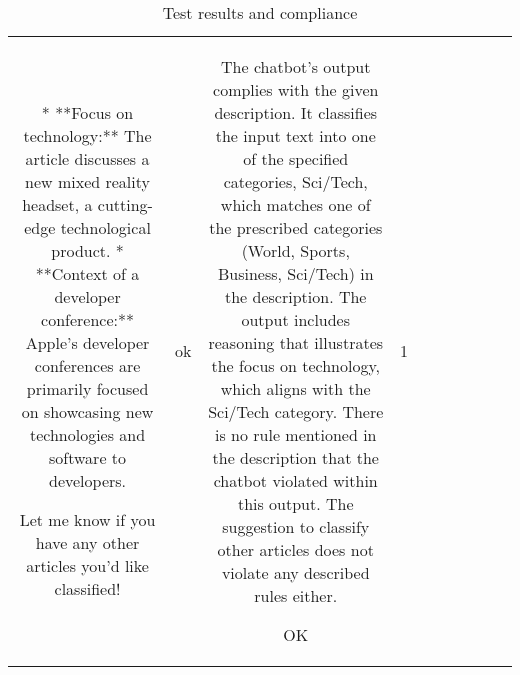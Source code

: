 \begin{table}[h!]
\begin{tabular}{|c|c|c|c|c|c|c|c|c|c|}
* **Focus on technology:** The article discusses a new mixed reality headset, a cutting-edge technological product.
* **Context of a developer conference:** Apple's developer conferences are primarily focused on showcasing new technologies and software to developers.



Let me know if you have any other articles you'd like classified! 
 & ok & The chatbot's output complies with the given description. It classifies the input text into one of the specified categories, Sci/Tech, which matches one of the prescribed categories (World, Sports, Business, Sci/Tech) in the description. The output includes reasoning that illustrates the focus on technology, which aligns with the Sci/Tech category. There is no rule mentioned in the description that the chatbot violated within this output. The suggestion to classify other articles does not violate any described rules either.

OK & 1
  \end{tabular}
  \caption{Test results and compliance}
  
  \end{table}
  